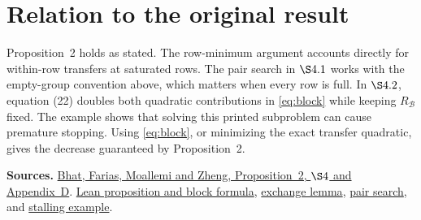 \documentclass[12pt,a4paper]{article}
\begin{document}
\section*{Relation to the original result}
Proposition~2 holds as stated. The row-minimum argument accounts directly
for within-row transfers at saturated rows. The pair search in \(\S4.1\)
works with the empty-group convention above, which matters when every
row is full. In \(\S4.2\), equation (22) doubles both quadratic contributions
in \eqref{eq:block} while keeping \(R_{\mathcal B}\) fixed. The example shows
that solving this printed subproblem can cause premature stopping.
Using \eqref{eq:block}, or minimizing the exact transfer quadratic, gives the
decrease guaranteed by Proposition~2.

{\small\textbf{Sources.}
\href{https://moallemi.com/ciamac/papers/kernel-adp-2012.pdf\#page=18}{Bhat, Farias, Moallemi and Zheng, Proposition~2, \(\S4\) and Appendix~D}.
\href{https://github.com/nikhilpb/kadp/blob/main/Kadp/ActiveSet.lean}{Lean proposition and block formula},
\href{https://github.com/nikhilpb/kadp/blob/main/Kadp/Exchange.lean}{exchange lemma},
\href{https://github.com/nikhilpb/kadp/blob/main/Kadp/PairSelection.lean}{pair search},
and \href{https://github.com/nikhilpb/kadp/blob/main/Kadp/Examples/Proposition2.lean}{stalling example}.}
\end{document}
